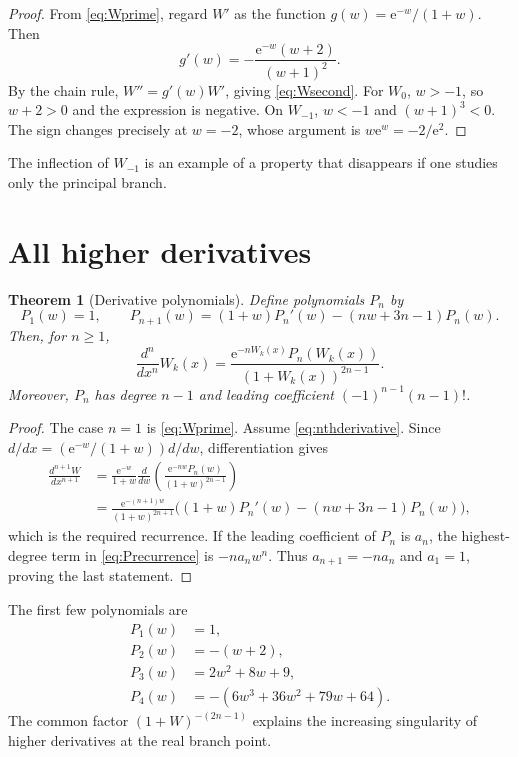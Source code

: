 \documentclass[11pt,oneside]{book}
\newtheorem{theorem}{Theorem}[chapter]
\theoremstyle{definition}
\theoremstyle{remark}
\newcommand{\ee}{\mathrm e}
\begin{document}
\begin{proof}
From \eqref{eq:Wprime}, regard $W'$ as the function
$g(w)=\ee^{-w}/(1+w)$.  Then
\[
 g'(w)=-\frac{\ee^{-w}(w+2)}{(w+1)^2}.
\]
By the chain rule, $W''=g'(w)W'$, giving \eqref{eq:Wsecond}.
For $W_0$, $w>-1$, so $w+2>0$ and the expression is negative.  On $W_{-1}$,
$w<-1$ and $(w+1)^3<0$.  The sign changes precisely at $w=-2$, whose
argument is $w\ee^w=-2/\ee^2$.
\end{proof}

The inflection of $W_{-1}$ is an example of a property that disappears if one
studies only the principal branch.

\section{All higher derivatives}

\begin{theorem}[Derivative polynomials]\label{thm:derivativepolynomials}
Define polynomials $P_n$ by
\begin{equation}\label{eq:Precurrence}
 P_1(w)=1,
 \qquad
 P_{n+1}(w)=(1+w)P_n'(w)-(nw+3n-1)P_n(w).
\end{equation}
Then, for $n\ge1$,
\begin{equation}\label{eq:nthderivative}
 \frac{d^n}{dx^n}W_k(x)
 =\frac{\ee^{-nW_k(x)}P_n(W_k(x))}
 {(1+W_k(x))^{2n-1}}.
\end{equation}
Moreover, $P_n$ has degree $n-1$ and leading coefficient
$(-1)^{n-1}(n-1)!$.
\end{theorem}

\begin{proof}
The case $n=1$ is \eqref{eq:Wprime}.  Assume \eqref{eq:nthderivative}.  Since
$d/dx=(\ee^{-w}/(1+w))d/dw$, differentiation gives
\begin{align*}
 \frac{d^{n+1}W}{dx^{n+1}}
 &=\frac{\ee^{-w}}{1+w}\frac{d}{dw}
   \left(\frac{\ee^{-nw}P_n(w)}{(1+w)^{2n-1}}\right)\\
 &=\frac{\ee^{-(n+1)w}}
 {(1+w)^{2n+1}}
 \bigl((1+w)P_n'(w)-(nw+3n-1)P_n(w)\bigr),
\end{align*}
which is the required recurrence.  If the leading coefficient of $P_n$ is
$a_n$, the highest-degree term in \eqref{eq:Precurrence} is
$-na_nw^n$.  Thus $a_{n+1}=-na_n$ and $a_1=1$, proving the last statement.
\end{proof}

The first few polynomials are
\begin{align*}
 P_1(w)&=1,\\
 P_2(w)&=-(w+2),\\
 P_3(w)&=2w^2+8w+9,\\
 P_4(w)&=-(6w^3+36w^2+79w+64).
\end{align*}
The common factor $(1+W)^{-(2n-1)}$ explains the increasing singularity of
higher derivatives at the real branch point.
\end{document}
